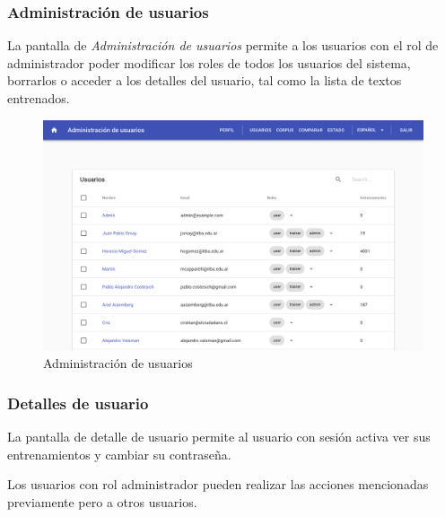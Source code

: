 \documentclass[12pt,a4paper,]{scrartcl}
\begin{document}
\hypertarget{administraciuxf3n-de-usuarios}{%
\subsubsection{Administración de usuarios}\label{administraciuxf3n-de-usuarios}}

La pantalla de \emph{Administración de usuarios} permite a los usuarios con el rol de administrador poder modificar los roles de todos los usuarios del sistema, borrarlos o acceder a los detalles del usuario, tal como la lista de textos entrenados.

\begin{figure}[H]

{\centering \includegraphics{assets/logic/user-list.pdf} 

}

\caption{Administración de usuarios}\label{fig:logic-user-list}
\end{figure}

\hypertarget{detalles-de-usuario}{%
\subsubsection{Detalles de usuario}\label{detalles-de-usuario}}

La pantalla de detalle de usuario permite al usuario con sesión activa ver sus entrenamientos y cambiar su contraseña.

Los usuarios con rol administrador pueden realizar las acciones mencionadas previamente pero a otros usuarios.
\end{document}
